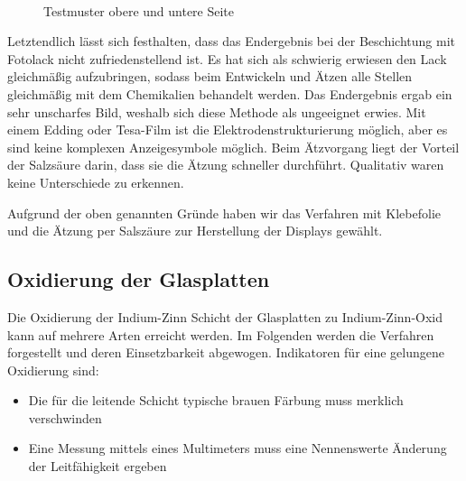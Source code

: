 \begin{figure}[t]
  \centering
~
 \caption{Testmuster obere und untere Seite}
 \end{figure}

Letztendlich lässt sich festhalten, dass das Endergebnis bei der Beschichtung mit Fotolack nicht zufriedenstellend ist. Es hat sich als schwierig erwiesen den Lack gleichmäßig aufzubringen, sodass beim Entwickeln und Ätzen alle Stellen gleichmäßig mit dem Chemikalien behandelt werden. Das Endergebnis ergab ein sehr unscharfes Bild, weshalb sich diese Methode als ungeeignet erwies. Mit einem Edding oder Tesa-Film ist die Elektrodenstrukturierung möglich, aber es sind keine komplexen Anzeigesymbole möglich.
Beim Ätzvorgang liegt der Vorteil der Salzsäure darin, dass sie die Ätzung schneller durchführt. Qualitativ waren keine Unterschiede zu erkennen.

Aufgrund der oben genannten Gründe haben wir das Verfahren mit Klebefolie und die Ätzung per Salszäure zur Herstellung der Displays gewählt.

\subsection{Oxidierung der Glasplatten}

Die Oxidierung der Indium-Zinn Schicht der Glasplatten zu Indium-Zinn-Oxid kann auf mehrere Arten erreicht werden. Im Folgenden werden die Verfahren forgestellt und deren Einsetzbarkeit abgewogen.
Indikatoren für eine gelungene Oxidierung sind:
\begin{itemize}
\item Die für die leitende Schicht typische brauen Färbung muss merklich verschwinden
\item Eine Messung mittels eines Multimeters muss eine Nennenswerte Änderung der Leitfähigkeit ergeben
\end{itemize}

